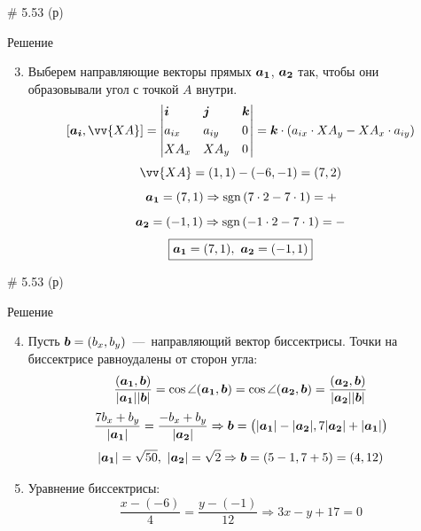 \documentclass[russian]{beamer}
\begin{document}
  \begin{frame}{\# 5.53 (р)}
    \begin{block}{Решение}
      \begin{enumerate}
        \setcounter{enumi}{2}
        
        \item Выберем направляющие векторы прямых $\boldsymbol{a_1}$, $\boldsymbol{a_2}$ так, чтобы они образовывали угол с точкой $A$ внутри.
        \[
          [\bds{a_i}, \vv{XA}] = \left|
            \begin{aligned}
              &\bds i & &\bds j & &\bds k\\
              &a_{ix} & &a_{iy} & &0\\
              &XA_x & &XA_y & &0
            \end{aligned}
          \right|
          = \bds k \cdot (a_{ix} \cdot XA_y - XA_x \cdot a_{iy})
        \]
        \[
          \vv{XA} = (1, 1) - (-6, -1) = (7, 2)
        \]
        \[
          \boldsymbol{a_1} = (7, 1) \Rightarrow \operatorname{sgn}{(7 \cdot 2 - 7 \cdot 1)} = +
        \]
        \[
          \boldsymbol{a_2} = (-1, 1) \Rightarrow \operatorname{sgn}{(-1 \cdot 2 - 7 \cdot 1)} = -
        \]
        \[
          \boxed{\boldsymbol{a_1} = (7, 1),\ \boldsymbol{a_2} = (-1, 1)}
        \]
      \end{enumerate}
    \end{block}
  \end{frame}


  \begin{frame}{\# 5.53 (р)}
    \begin{block}{Решение}
      \begin{enumerate}
        \setcounter{enumi}{3}
        
        \item Пусть $\bds b \hm= (b_x, b_y)$~---~направляющий вектор биссектрисы. Точки на биссектрисе равноудалены от сторон угла:
        \[
          \frac{(\boldsymbol{a_1}, \boldsymbol b)}{|\boldsymbol{a_1}||\boldsymbol b|} = \cos \angle (\boldsymbol{a_1}, \boldsymbol b)
          = \cos \angle (\boldsymbol{a_2}, \boldsymbol b)
          = \frac{(\boldsymbol{a_2}, \boldsymbol b)}{|\boldsymbol{a_2}||\boldsymbol b|}
        \]
        \[
          \frac{7 b_x + b_y}{|\boldsymbol{a_1}|} = \frac{-b_x + b_y}{|\boldsymbol{a_2}|}
          \Rightarrow
          \boldsymbol b = \bigl(|\boldsymbol{a_1}| - |\boldsymbol{a_2}|, 7|\boldsymbol{a_2}| + |\boldsymbol{a_1}|\bigr)
        \]
        \[
          |\boldsymbol{a_1}| = \sqrt{50},\ |\boldsymbol{a_2}| = \sqrt{2} \Rightarrow \boldsymbol b = (5 - 1, 7 + 5) = (4, 12)
        \]
        
        \pause
        
        \item Уравнение биссектрисы:
        \[
          \frac{x - (-6)}{4} = \frac{y - (-1)}{12}
          \Rightarrow \boxed{3x - y + 17 = 0}
        \]
      \end{enumerate}
    \end{block}
  \end{frame}
\end{document}
